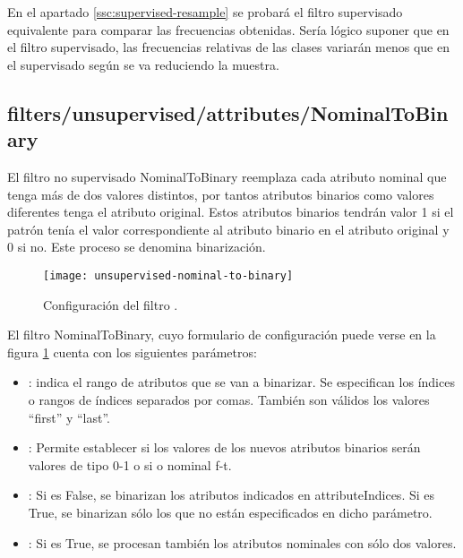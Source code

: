 En el apartado \ref{ssc:supervised-resample} se probará el filtro supervisado equivalente para comparar las frecuencias obtenidas. Sería lógico suponer que en el filtro supervisado, las frecuencias relativas de las clases variarán menos que en el supervisado según se va reduciendo la muestra.

\subsection{filters/unsupervised/attributes/NominalToBinary}
El filtro no supervisado NominalToBinary reemplaza cada atributo nominal que tenga más de dos valores distintos, por tantos atributos binarios como valores diferentes tenga el atributo original. Estos atributos binarios tendrán valor 1 si el patrón tenía el valor correspondiente al atributo binario en el atributo original y 0 si no. Este proceso se denomina binarización.

\begin{figure}[ht]
    \centering
    \texttt{[image: unsupervised-nominal-to-binary]}
    \caption{Configuración del filtro .}
    \label{fig:unsupervised-nominal-to-binary}
\end{figure}

El filtro NominalToBinary, cuyo formulario de configuración puede verse en la figura \ref{fig:unsupervised-nominal-to-binary} cuenta con los siguientes parámetros:

\begin{itemize}
    \item {}: indica el rango de atributos que se van a binarizar. Se especifican los índices o rangos de índices separados por comas. También son válidos los valores ``first'' y ``last''.
    \item {}: Permite establecer si los valores de los nuevos atributos binarios serán valores de tipo 0-1 o si o nominal f-t.
    \item {}: Si es False, se binarizan los atributos indicados en attributeIndices. Si es True, se binarizan sólo los que no están especificados en dicho parámetro.
    \item {}: Si es True, se procesan también los atributos nominales con sólo dos valores.
\end{itemize}

